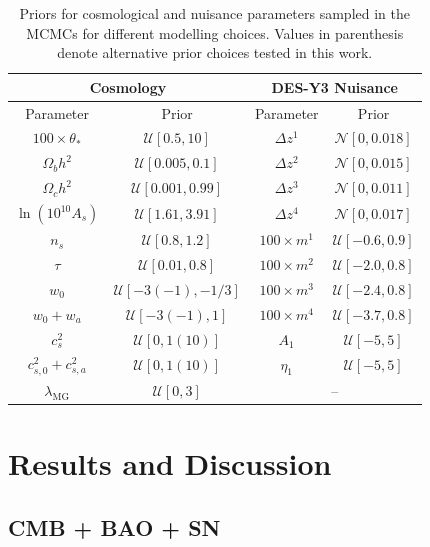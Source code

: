 \documentclass[%
reprint,
superscriptaddress,
preprint numbers,
nofootinbib,
amsmath,amssymb,
aps,
prd
]{revtex4-2}
\begin{document}
\begin{table}[t]
    \centering
    \begin{tabular}{| c | c || c | c |}
        \hline
        \multicolumn{2}{|c||}{Cosmology} & \multicolumn{2}{c|}{DES-Y3 Nuisance} \\\hline
        \hline
         Parameter  &  Prior & Parameter & Prior \\\hline
        $100\times\theta_*$ & $\mathcal{U}[0.5, 10]$ & $\Delta z^1$ & $\mathcal{N}[0, 0.018]$\\\hline
        $\Omega_bh^2$ & $\mathcal{U}[0.005, 0.1]$ & $\Delta z^2$ & $\mathcal{N}[0, 0.015]$\\\hline
        $\Omega_ch^2$ & $\mathcal{U}[0.001, 0.99]$ & $\Delta z^3$ & $\mathcal{N}[0, 0.011]$\\\hline
        $\ln(10^{10}A_s)$ & $\mathcal{U}[1.61, 3.91]$ & $\Delta z^4$ & $\mathcal{N}[0, 0.017]$\\\hline
        $n_s$ & $\mathcal{U}[0.8, 1.2]$ & $100\times m^1$ & $\mathcal{U}[-0.6, 0.9]$\\\hline
        $\tau$ & $\mathcal{U}[0.01, 0.8]$ & $100\times m^2$ & $\mathcal{U}[-2.0, 0.8]$\\\hline
        $w_0$ & $\mathcal{U}[-3(-1), -1/3]$ & $100\times m^3$ & $\mathcal{U}[-2.4, 0.8]$\\\hline
        $w_0 + w_a$ & $\mathcal{U}[-3(-1), 1]$ & $100\times m^4$ & $\mathcal{U}[-3.7, 0.8]$\\\hline
        $c_s^2$ & $\mathcal{U}[0, 1(10)]$ & $A_1$ & $\mathcal{U}[-5, 5]$\\\hline
        $c_{s,0}^2 + c_{s,a}^2$ & $\mathcal{U}[0, 1(10)]$ & $\eta_1$ & $\mathcal{U}[-5, 5]$\\\hline
        $\lambda_\mathrm{MG}$ & $\mathcal{U}[0, 3]$ & \multicolumn{2}{|c|}{--} \\\hline
    \end{tabular}
    \caption{Priors for cosmological and nuisance parameters sampled in the MCMCs for different modelling choices. Values in parenthesis denote alternative prior choices tested in this work.}
    \label{tab:priors}
\end{table}

\section{Results and Discussion}
\label{sec:results}

\subsection{CMB + BAO + SN}
\end{document}
